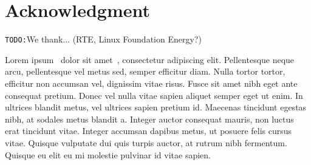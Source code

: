 \documentclass[conference]{IEEEtran}
\newcommand{\TODO}{\texttt{TODO:}}
\begin{document}
\section*{Acknowledgment}

\TODO We thank...  (RTE, Linux Foundation Energy?)

Lorem ipsum~\cite{Fabozzi09} dolor sit amet~\cite{Fabozzi11}, consectetur
adipiscing elit. Pellentesque neque arcu, pellentesque vel metus sed, semper
efficitur diam. Nulla tortor tortor, efficitur non accumsan vel, dignissim vitae
risus. Fusce sit amet nibh eget ante consequat pretium. Donec vel nulla vitae
sapien aliquet semper eget ut enim. In ultrices blandit metus, vel ultrices
sapien pretium id. Maecenas tincidunt egestas nibh, at sodales metus blandit
a. Integer auctor consequat mauris, non luctus erat tincidunt vitae. Integer
accumsan dapibus metus, ut posuere felis cursus vitae. Quisque vulputate dui
quis turpis auctor, at rutrum nibh fermentum. Quisque eu elit eu mi molestie
pulvinar id vitae sapien.






\end{document}
